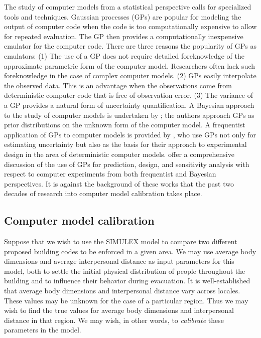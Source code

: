 \documentclass{article}
\begin{document}
The study of computer models from a statistical perspective calls for specialized tools and techniques. Gaussian processes (GPs) are popular for modeling the output of computer code when the code is too computationally expensive to allow for repeated evaluation. The GP then provides a computationally inexpensive emulator for the computer code. There are three reasons the popularity of GPs as emulators: (1) The use of a GP does not require detailed foreknowledge of the approximate parametric form of the computer model. Researchers often lack such foreknowledge in the case of complex computer models. (2) GPs easily interpolate the observed data. This is an advantage when the observations come from deterministic computer code that is free of observation error. (3) The variance of a GP provides a natural form of uncertainty quantification. 
A Bayesian approach to the study of computer models is undertaken by \cite{Currin1991}; the authors approach GPs as prior distributions on the unknown form of the computer model. A frequentist application of GPs to computer models is provided by \cite{Sacks1989}, who use GPs not only for estimating uncertainty but also as the basis for their approach to experimental design in the area of deterministic computer models.  \cite{Santner2003a} offer a comprehensive discussion of the use of GPs for prediction, design, and sensitivity analysis with respect to computer experiments from both frequentist and Bayesian perspectives. It is against the background of these works that the past two decades of research into computer model calibration takes place.

\subsection{Computer model calibration} \label{computer_model_calibration}

Suppose that we wish to use the SIMULEX model to compare two different proposed building codes to be enforced in a given area. We may use average body dimensions and average interpersonal distance as input parameters for this model, both to settle the initial physical distribution of people throughout the building and to influence their behavior during evacuation. It is well-established that average body dimensions \citep{Subramanian2011,Cavelaars2000} %
and interpersonal distance \citep{Sorokowska2017} vary across locales. These values may be unknown for the case of a particular region. Thus we may wish to find the true values for average body dimensions and interpersonal distance in that region. We may wish, in other words, to \textit{calibrate} these parameters in the model.
\end{document}
